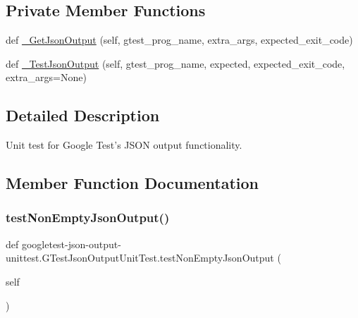 \subsection*{Private Member Functions}
\begin{DoxyCompactItemize}
\item 
def \mbox{\hyperlink{classgoogletest-json-output-unittest_1_1_g_test_json_output_unit_test_aba4f4e2702b683350de508ec5eaaab55}{\+\_\+\+Get\+Json\+Output}} (self, gtest\+\_\+prog\+\_\+name, extra\+\_\+args, expected\+\_\+exit\+\_\+code)
\item 
def \mbox{\hyperlink{classgoogletest-json-output-unittest_1_1_g_test_json_output_unit_test_a0145de3211dd5d9e50aa23c8ae9fde5e}{\+\_\+\+Test\+Json\+Output}} (self, gtest\+\_\+prog\+\_\+name, expected, expected\+\_\+exit\+\_\+code, extra\+\_\+args=None)
\end{DoxyCompactItemize}


\subsection{Detailed Description}
\begin{DoxyVerb}Unit test for Google Test's JSON output functionality.
\end{DoxyVerb}
 

\subsection{Member Function Documentation}
\mbox{\label{classgoogletest-json-output-unittest_1_1_g_test_json_output_unit_test_ab5520f22133356e62a54cdb5756504bc}} 
\subsubsection{\texorpdfstring{test\+Non\+Empty\+Json\+Output()}{testNonEmptyJsonOutput()}}
{\footnotesize\ttfamily def googletest-\/json-\/output-\/unittest.\+G\+Test\+Json\+Output\+Unit\+Test.\+test\+Non\+Empty\+Json\+Output (\begin{DoxyParamCaption}\item[{}]{self }\end{DoxyParamCaption})}

